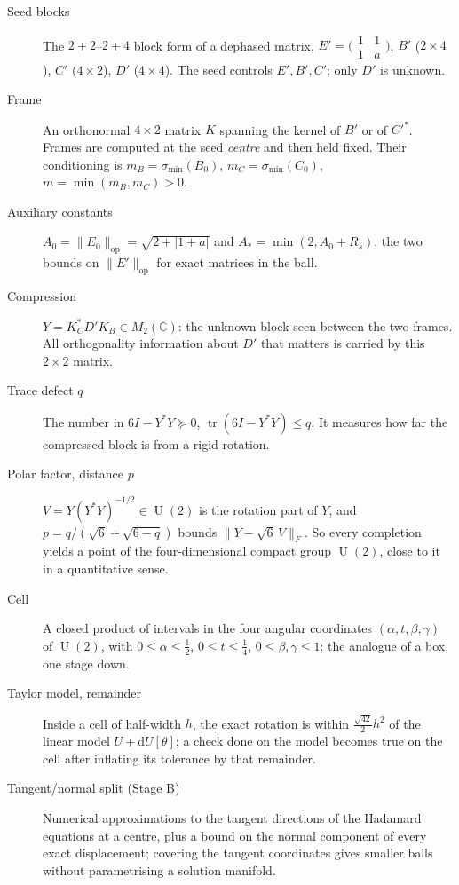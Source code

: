 \documentclass[11pt]{article}
\newcommand{\C}{\mathbb{C}}
\newcommand{\abs}[1]{\lvert #1\rvert}
\newcommand{\norm}[1]{\lVert #1\rVert}
\DeclareMathOperator{\tr}{tr}
\DeclareMathOperator{\U}{U}
\newcommand{\grp}[1]{\par\medskip\noindent{\normalsize\bfseries #1}\par\nobreak\vspace{-1pt}}
\begin{document}
\grp{5.\ Stage A and Stage B}

\begin{description}
\item[Seed blocks] The $2+2$--$2+4$ block form of a dephased matrix,
$E'=\bigl(\begin{smallmatrix}1&1\\1&a\end{smallmatrix}\bigr)$, $B'$ ($2\times4$), $C'$ ($4\times2$),
$D'$ ($4\times4$). The seed controls $E',B',C'$; only $D'$ is unknown.
\item[Frame] An orthonormal $4\times2$ matrix $K$ spanning the kernel of $B'$ or of $C'^*$. Frames are
computed at the seed \emph{centre} and then held fixed. Their conditioning is
$m_B=\sigma_{\min}(B_0)$, $m_C=\sigma_{\min}(C_0)$, $m=\min(m_B,m_C)>0$.
\item[Auxiliary constants] $A_0=\norm{E_0}_{\mathrm{op}}=\sqrt{2+\abs{1+a}}$ and
$A_*=\min(2,A_0+R_s)$, the two bounds on $\norm{E'}_{\mathrm{op}}$ for exact matrices in the ball.
\item[Compression] $Y=K_C^*D'K_B\in M_2(\C)$: the unknown block seen between the two frames. All
orthogonality information about $D'$ that matters is carried by this $2\times2$ matrix.
\item[Trace defect $q$] The number in $6I-Y^*Y\succeq0$, $\tr(6I-Y^*Y)\le q$. It measures how far the
compressed block is from a rigid rotation.
\item[Polar factor, distance $p$] $V=Y(Y^*Y)^{-1/2}\in\U(2)$ is the rotation part of $Y$, and
$p=q/(\sqrt6+\sqrt{6-q})$ bounds $\norm{Y-\sqrt6\,V}_F$. So every completion yields a point of the
four-dimensional compact group $\U(2)$, close to it in a quantitative sense.
\item[Cell] A closed product of intervals in the four angular coordinates $(\alpha,t,\beta,\gamma)$ of
$\U(2)$, with $0\le\alpha\le\tfrac12$, $0\le t\le\tfrac14$, $0\le\beta,\gamma\le1$: the analogue of a
box, one stage down.
\item[Taylor model, remainder] Inside a cell of half-width $h$, the exact rotation is within
$\tfrac{\sqrt{42}}2h^2$ of the linear model $U+\mathrm dU[\theta]$; a check done on the model becomes
true on the cell after inflating its tolerance by that remainder.
\item[Tangent/normal split (Stage B)] Numerical approximations to the tangent directions of the
Hadamard equations at a centre, plus a bound on the normal component of every exact displacement;
covering the tangent coordinates gives smaller balls without parametrising a solution manifold.
\end{description}
\end{document}
